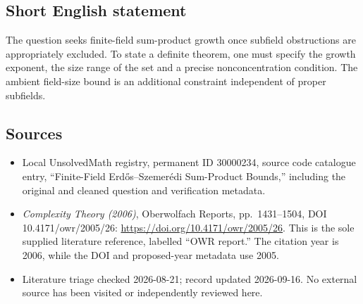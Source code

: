 \documentclass[11pt]{article}
\begin{document}
\subsection{Short English statement}
The question seeks finite-field sum-product growth once subfield obstructions are appropriately excluded. To state a definite theorem, one must specify the growth exponent, the size range of the set and a precise nonconcentration condition. The ambient field-size bound is an additional constraint independent of proper subfields.
\subsection{Sources}
\begin{itemize}
\item Local UnsolvedMath registry, permanent ID 30000234, source code catalogue entry, ``Finite-Field Erd\H{o}s--Szemer\'edi Sum-Product Bounds,'' including the original and cleaned question and verification metadata.
\item \emph{Complexity Theory (2006)}, Oberwolfach Reports, pp.\ 1431--1504, DOI 10.4171/owr/2005/26: \url{https://doi.org/10.4171/owr/2005/26}. This is the sole supplied literature reference, labelled ``OWR report.'' The citation year is 2006, while the DOI and proposed-year metadata use 2005.
\item Literature triage checked 2026-08-21; record updated 2026-09-16. No external source has been visited or independently reviewed here.
\end{itemize}
\end{document}
